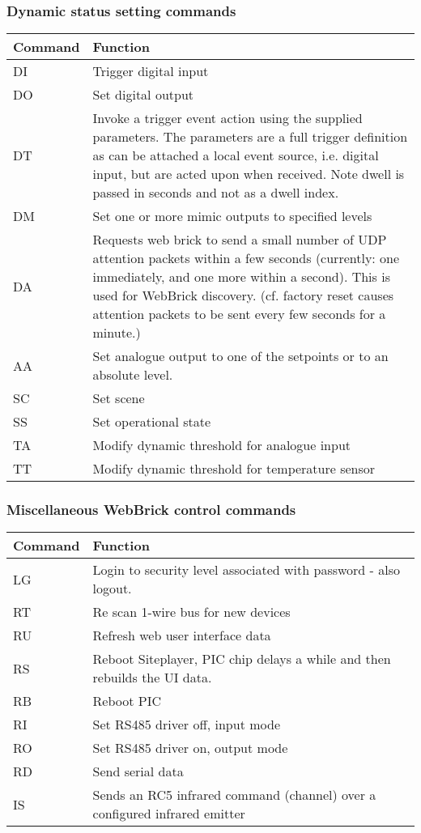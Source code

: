 \subsubsection{Dynamic status setting commands}

\begin{tabular}{l|p{12cm}}
Command&Function\\
\hline
DI&Trigger digital input\\
DO&Set digital output\\
DT&Invoke a trigger event action using the supplied parameters. The parameters are a full trigger definition as can
be attached a local event source, i.e. digital input, but are acted upon when received. Note dwell is passed in seconds and not as a dwell index.\\
DM&Set one or more mimic outputs to specified levels\\
DA&Requests web brick to send a small number of UDP attention packets within a few seconds (currently: one immediately, and one more within a second).  This is used for WebBrick discovery.  (cf. factory reset causes attention packets to be sent every few seconds for a minute.)\\
AA&Set analogue output to one of the setpoints or to an absolute level.\\
SC&Set scene\\
SS&Set operational state\\
TA&Modify dynamic threshold for analogue input\\
TT&Modify dynamic threshold for temperature sensor\\
\end{tabular}


\subsubsection{Miscellaneous WebBrick control commands}

\begin{tabular}{l|p{12cm}}
Command&Function\\
\hline
LG&Login to security level associated with password - also logout.\\
RT&Re scan 1-wire bus for new devices\\
RU&Refresh web user interface data\\
RS&Reboot Siteplayer, PIC chip delays a while and then rebuilds the UI data.\\
RB&Reboot PIC\\
RI&Set RS485 driver off, input mode\\
RO&Set RS485 driver on, output mode\\
RD&Send serial data\\
IS&Sends an RC5 infrared command (channel) over a configured infrared emitter\\
\end{tabular}



